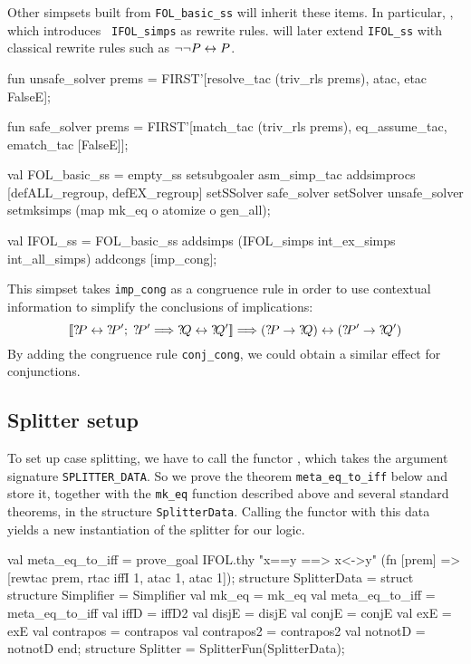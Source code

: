 Other simpsets built from \texttt{FOL_basic_ss} will inherit these items.
In particular, , which introduces {\tt
  IFOL_simps} as rewrite rules.   will later
extend \texttt{IFOL_ss} with classical rewrite rules such as $\neg\neg
P\leftrightarrow P$.
\begin{ttbox}
fun unsafe_solver prems = FIRST'[resolve_tac (triv_rls {\at} prems),
                                 atac, etac FalseE];

fun   safe_solver prems = FIRST'[match_tac (triv_rls {\at} prems),
                                 eq_assume_tac, ematch_tac [FalseE]];

val FOL_basic_ss = empty_ss setsubgoaler asm_simp_tac
                            addsimprocs [defALL_regroup, defEX_regroup]
                            setSSolver   safe_solver
                            setSolver  unsafe_solver
                            setmksimps (map mk_eq o atomize o gen_all);

val IFOL_ss = FOL_basic_ss addsimps (IFOL_simps {\at} 
                                     int_ex_simps {\at} int_all_simps)
                           addcongs [imp_cong];
\end{ttbox}
This simpset takes \texttt{imp_cong} as a congruence rule in order to use
contextual information to simplify the conclusions of implications:
\[ \List{\Var{P}\bimp\Var{P'};\; \Var{P'} \Imp \Var{Q}\bimp\Var{Q'}} \Imp
   (\Var{P}\imp\Var{Q}) \bimp (\Var{P'}\imp\Var{Q'})
\]
By adding the congruence rule \texttt{conj_cong}, we could obtain a similar
effect for conjunctions.


\subsection{Splitter setup}

To set up case splitting, we have to call the \ML{} functor , which takes the argument signature \texttt{SPLITTER_DATA}. 
So we prove the theorem \texttt{meta_eq_to_iff} below and store it, together
with the \texttt{mk_eq} function described above and several standard
theorems, in the structure \texttt{SplitterData}. Calling the functor with
this data yields a new instantiation of the splitter for our logic.
\begin{ttbox}
val meta_eq_to_iff = prove_goal IFOL.thy "x==y ==> x<->y"
  (fn [prem] => [rewtac prem, rtac iffI 1, atac 1, atac 1]);
\ttbreak
structure SplitterData =
  struct
  structure Simplifier = Simplifier
  val mk_eq          = mk_eq
  val meta_eq_to_iff = meta_eq_to_iff
  val iffD           = iffD2
  val disjE          = disjE
  val conjE          = conjE
  val exE            = exE
  val contrapos      = contrapos
  val contrapos2     = contrapos2
  val notnotD        = notnotD
  end;
\ttbreak
structure Splitter = SplitterFun(SplitterData);
\end{ttbox}



